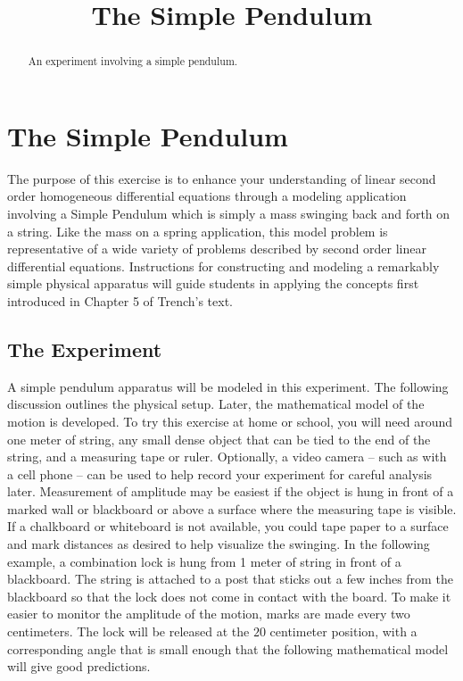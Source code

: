 \documentclass{ximera}
\title{The Simple Pendulum}
\begin{document}
 
\begin{abstract}
An experiment involving a simple pendulum.
\end{abstract}
 
\maketitle
 
 \section*{The Simple Pendulum}
 The purpose of this exercise is to enhance your understanding of linear second order homogeneous differential equations through a modeling application involving a Simple Pendulum which is simply a mass swinging back and forth on a string.  Like the mass on a spring application, this model problem is representative of a wide variety of problems described by second order linear differential equations.  Instructions for constructing and modeling a remarkably simple physical apparatus will guide students in applying the concepts first introduced in Chapter 5 of Trench’s text.
 
 \subsection*{The Experiment}
 A simple pendulum apparatus will be modeled in this experiment.  The following discussion outlines the physical setup.  Later, the mathematical model of the motion is developed.
To try this exercise at home or school, you will need around one meter of string, any small dense object that can be tied to the end of the string, and a measuring tape or ruler.  Optionally, a video camera – such as with a cell phone – can be used to help record your experiment for careful analysis later.  Measurement of amplitude may be easiest if the object is hung in front of a marked wall or blackboard or above a surface where the measuring tape is visible.  If a chalkboard or whiteboard is not available, you could tape paper to a surface and mark distances as desired to help visualize the swinging.
In the following example, a combination lock is hung from 1 meter of string in front of a blackboard.  The string is attached to a post that sticks out a few inches from the blackboard so that the lock does not come in contact with the board.  To make it easier to monitor the amplitude of the motion, marks are made every two centimeters.  The lock will be released at the $20$ centimeter position, with a corresponding angle that is small enough that the following mathematical model will give good predictions.
\end{document}
